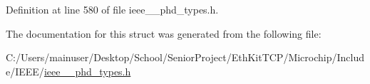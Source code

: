 Definition at line 580 of file ieee\+\_\+\_\+phd\+\_\+types.\+h.



The documentation for this struct was generated from the following file\+:\begin{DoxyCompactItemize}
\item 
C\+:/\+Users/mainuser/\+Desktop/\+School/\+Senior\+Project/\+Eth\+Kit\+T\+C\+P/\+Microchip/\+Include/\+I\+E\+E\+E/\hyperlink{ieee__11073__phd__types_8h}{ieee\+\_\+\_\+phd\+\_\+types.\+h}\end{DoxyCompactItemize}
